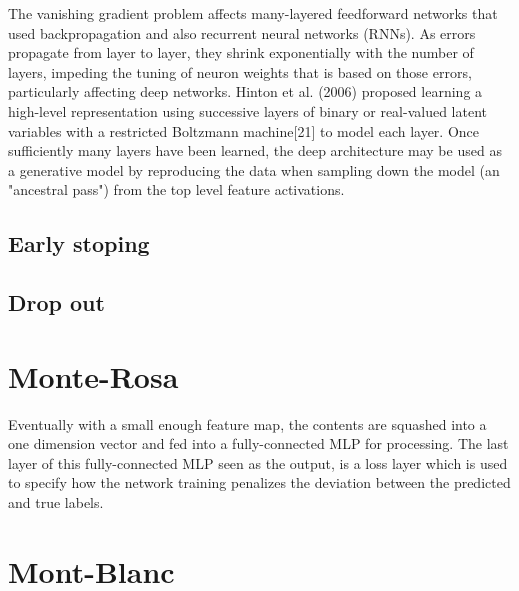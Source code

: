 \documentclass[final, paper=letter,5p,times,twocolumn]{elsarticle}
\begin{document}
The vanishing gradient problem affects many-layered feedforward networks that used backpropagation and also recurrent neural networks (RNNs). As errors propagate from layer to layer, they shrink exponentially with the number of layers, impeding the tuning of neuron weights that is based on those errors, particularly affecting deep networks. Hinton et al. (2006) proposed learning a high-level representation using successive layers of binary or real-valued latent variables with a restricted Boltzmann machine[21] to model each layer. Once sufficiently many layers have been learned, the deep architecture may be used as a generative model by reproducing the data when sampling down the model (an "ancestral pass") from the top level feature activations.\\
\lipsum[19-19]


\subsection{Early stoping}
\lipsum[21-21]
\subsection{Drop out}
\lipsum[22-22]


\section{Monte-Rosa}

\lipsum[30-33]

Eventually with a small enough feature map, the contents are squashed into a one dimension vector and fed into a fully-connected MLP for processing. The last layer of this fully-connected MLP seen as the output, is a loss layer which is used to specify how the network training penalizes the deviation between the predicted and true labels.


\section{Mont-Blanc}
\end{document}
